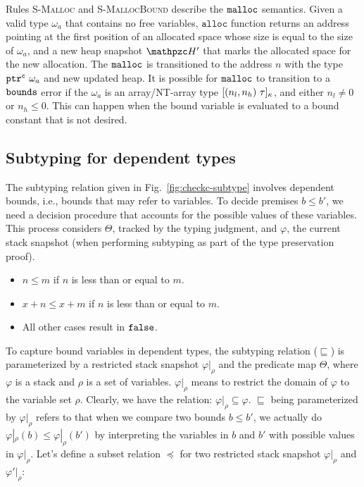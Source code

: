 Rules \textsc{S-Malloc} and \textsc{S-MallocBound} describe the $\mathtt{malloc}$ semantics. Given a valid type $\omega_a$ that contains no free variables, $\mathtt{alloc}$ function returns an address pointing at the first position of an allocated space whose size is equal to the size of $\omega_a$, and a new heap snapshot $\heap'$ that marks the allocated space for the new allocation. The $\mathtt{malloc}$ is transitioned to the address $n$ with the type ${\mathtt{ptr}^{\texttt{c}}~{\omega_a}}$ and new updated heap. It is possible for $\mathtt{malloc}$ to transition to a $\mathtt{bounds}$ error if the $\omega_a$ is an array/NT-array type $[{({n_l},{n_h})}~{\tau}]_{\kappa}$, and either $n_l \neq 0$ or $n_h \le 0$. This can happen when the bound variable is evaluated to a bound constant that is not desired. 


\subsection{Subtyping for dependent types}
\label{app:le}
  
The subtyping relation given in Fig.~\ref{fig:checkc-subtype} involves
dependent bounds, i.e., bounds that may refer to variables. To decide
premises $b \leq b'$, we need a decision procedure that accounts for
the possible values of these variables. This process considers
$\Theta$, tracked by the typing judgment, and $\varphi$, the current
stack snapshot (when performing subtyping as part of the type
preservation proof).

\begin{defi}[Inequality]

\begin{itemize}

\item $n \le m$ if $n$ is less than or equal to $m$.
\item $x+n \le x + m$ if $n$ is less than or equal to $m$.
\item All other cases result in $\mathtt{false}$.

\end{itemize}
\end{defi}

To capture bound variables in dependent types, the \checkedc subtyping
relation ($\sqsubseteq$) is parameterized by a restricted stack
snapshot $\varphi|_{\rho}$ and the predicate map $\Theta$, where
$\varphi$ is a stack and $\rho$ is a set of
variables. $\varphi|_{\rho}$ means to restrict the domain of $\varphi$
to the variable set $\rho$. Clearly, we have the relation:
$\varphi|_{\rho} \subseteq \varphi$. $\sqsubseteq$
being parameterized by $\varphi|_{\rho}$ refers to that when we
compare two bounds $b \le b'$, we actually do
$\varphi|_{\rho}(b) \le \varphi|_{\rho}(b')$ by interpreting the
variables in $b$ and $b'$ with possible values in $\varphi|_{\rho}$.
Let's define a subset relation $\preceq$ for two restricted stack
snapshot $\varphi|_{\rho}$ and $\varphi'|_{\rho}$:


